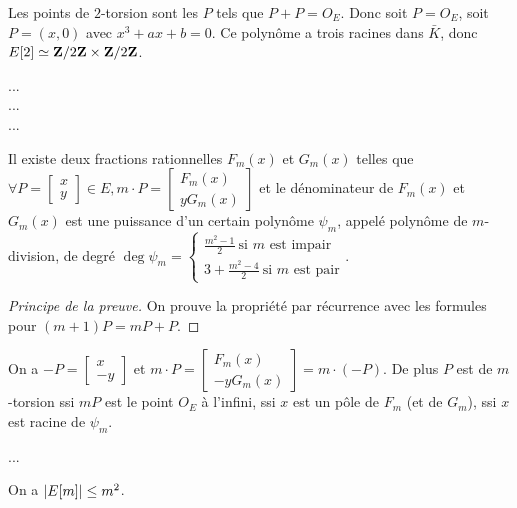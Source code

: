 	\begin{ex}
		Les points de $2$-torsion sont les $P$ tels que $P + P = O_E$.
		Donc soit $P = O_E$, soit $P = (x,0)$ avec $x^3 + ax + b = 0$.
		Ce polynôme a trois racines dans $\bar K$, donc $E[2] \simeq \mathbf{Z}/2\mathbf{Z} \times \mathbf{Z}/2\mathbf{Z}$.
	\end{ex}
	
	...\\
	...\\
	...%
	
	\begin{pop}
		Il existe deux fractions rationnelles $F_m(x)$ et $G_m(x)$ telles que $\forall P = \begin{bmatrix} x \\ y \end{bmatrix} \in E, m \cdot P = \begin{bmatrix} F_m(x) \\ y G_m(x) \end{bmatrix}$ et le dénominateur de $F_m(x)$ et $G_m(x)$ est une puissance d'un certain polynôme $\psi_m$, appelé polynôme de $m$-division, de degré $\deg \psi_m = \left\{ \begin{array}{l}
		\frac{m^2 - 1}{2}\ \text{si $m$ est impair} \\
		3 + \frac{m^2 - 4}{2}\ \text{si $m$ est pair} \end{array}\right.$.
	\end{pop}
	
	\begin{proof}[Principe de la preuve]
		On prouve la propriété par récurrence avec les formules pour $(m + 1)P = mP + P$.
	\end{proof}
	
	\begin{rem}
		On a $-P = \begin{bmatrix} x \\ -y \end{bmatrix}$ et $m \cdot P = \begin{bmatrix} F_m(x) \\ -y G_m(x) \end{bmatrix} = m \cdot (-P)$.
		De plus $P$ est de $m$-torsion ssi $mP$ est le point $O_E$ à l'infini, ssi $x$ est un pôle de $F_m$ (et de $G_m$), ssi $x$ est racine de $\psi_m$.
	\end{rem}
	
	\begin{ex}
		...
	\end{ex}
	
	\begin{cor}
		On a $\left\lvert E[m]\right\rvert \leq m^2$.
	\end{cor}
	
